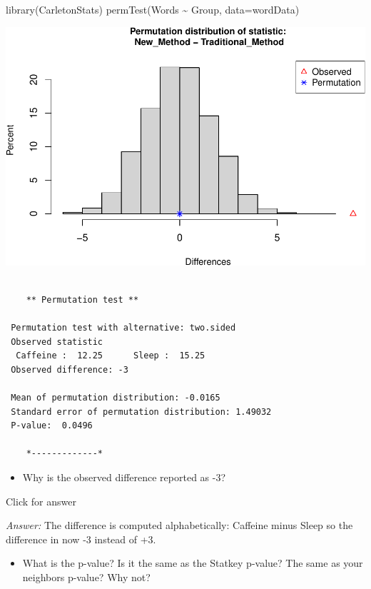 \documentclass[
]{book}
\newenvironment{Shaded}{\begin{snugshade}}{\end{snugshade}}
\newcommand{\AttributeTok}[1]{\textcolor[rgb]{0.77,0.63,0.00}{#1}}
\newcommand{\FunctionTok}[1]{\textcolor[rgb]{0.00,0.00,0.00}{#1}}
\newcommand{\NormalTok}[1]{#1}
\newcommand{\SpecialCharTok}[1]{\textcolor[rgb]{0.00,0.00,0.00}{#1}}
\providecommand{\tightlist}{%
  \setlength{\itemsep}{0pt}\setlength{\parskip}{0pt}}
\begin{document}
\begin{Shaded}
\begin{Highlighting}[]
\FunctionTok{library}\NormalTok{(CarletonStats)}
\FunctionTok{permTest}\NormalTok{(Words }\SpecialCharTok{\textasciitilde{}}\NormalTok{ Group, }\AttributeTok{data=}\NormalTok{wordData)}
\end{Highlighting}
\end{Shaded}

\includegraphics[width=1\linewidth]{Class_Activity_13_files/figure-latex/unnamed-chunk-2-1}

\begin{verbatim}

    ** Permutation test **

 Permutation test with alternative: two.sided 
 Observed statistic
  Caffeine :  12.25      Sleep :  15.25 
 Observed difference: -3 

 Mean of permutation distribution: -0.0165 
 Standard error of permutation distribution: 1.49032 
 P-value:  0.0496 

    *-------------*
\end{verbatim}

\begin{itemize}
\tightlist
\item
  Why is the observed difference reported as -3?
\end{itemize}

Click for answer

\emph{Answer:} The difference is computed alphabetically: Caffeine minus Sleep so the difference in now -3 instead of +3.

\begin{itemize}
\tightlist
\item
  What is the p-value? Is it the same as the Statkey p-value? The same as your neighbors p-value? Why not?
\end{itemize}
\end{document}
